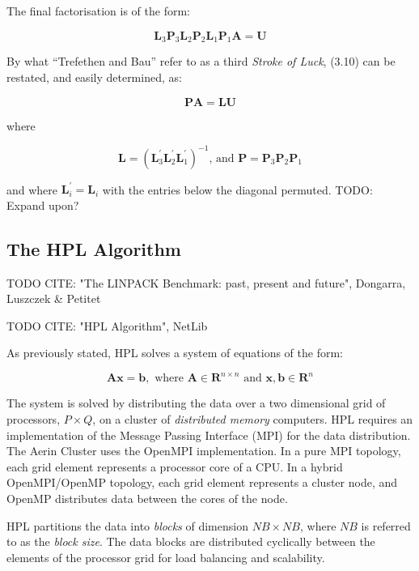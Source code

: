 The final factorisation is of the form:

\begin{equation}
\mathbf{L}_3\mathbf{P}_3\mathbf{L}_2\mathbf{P}_2\mathbf{L}_1\mathbf{P}_1\mathbf{A} = \mathbf{U}
\end{equation}

By what ``Trefethen and Bau'' refer to as a third \emph{Stroke of Luck}, (3.10) can be restated, and easily determined, as:

\begin{equation}
\mathbf{P}\mathbf{A} = \mathbf{L}\mathbf{U}
\end{equation}

where

\begin{equation}
\mathbf{L} = (\mathbf{L}_3^{'}\mathbf{L}_2^{'}\mathbf{L}_1^{'})^{-1} \text{, and } \mathbf{P} = \mathbf{P}_3\mathbf{P}_2\mathbf{P}_1
\end{equation}

and where $\mathbf{L}_i^{'} = \mathbf{L}_i$ with the entries below the diagonal permuted. TODO: Expand upon?


%
%
\subsection{The HPL Algorithm}

TODO CITE: "The LINPACK Benchmark: past, present and future", Dongarra, Luszczek \& Petitet

TODO CITE: "HPL Algorithm", NetLib

As previously stated, HPL solves a system of equations of the form:

\begin{equation}
\mathbf{Ax} = \mathbf{b},\text{ where }\mathbf{A} \in \mathbf{R}^{n\times n}\text{ and }\mathbf{x}, \mathbf{b} \in \mathbf{R}^n
\end{equation} 

The system is solved by distributing the data over a two dimensional grid of processors, $P \times Q$, on a cluster of \emph{distributed memory} computers. HPL requires an implementation of the Message Passing Interface (MPI) for the data distribution. The Aerin Cluster uses the OpenMPI implementation. In a pure MPI topology, each grid element represents a processor core of a CPU. In a hybrid OpenMPI/OpenMP topology, each grid element represents a cluster node, and OpenMP distributes data between the cores of the node.   

HPL partitions the data into \emph{blocks} of dimension $NB \times NB$, where $NB$ is referred to as the \emph{block size}. The data blocks are distributed cyclically between the elements of the processor grid for load balancing and scalability. 

